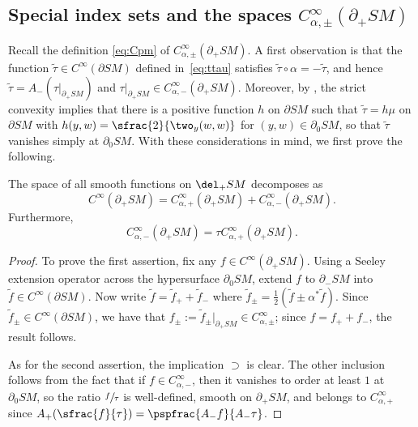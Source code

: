 \subsection{Special index sets and the spaces $C_{\alpha,\pm}^\infty(\partial_+ SM)$} \label{sec:indexSets}

Recall the definition \eqref{eq:Cpm} of $C_{\alpha,\pm}^\infty(\partial_+ SM)$. A first observation is that the function $\tilde \tau \in C^\infty(\partial SM)$ defined in~\eqref{eq:ttau} satisfies $\tilde\tau \circ \alpha = -\tilde\tau$, and hence $\tilde\tau = A_- (\tau|_{\partial_+ SM})$ and $\tau|_{\partial_+ SM}\in C_{\alpha,-}^\infty(\partial_+ SM)$. Moreover, by \cite[Lem.\,6.11]{Monard2020a}, the strict convexity implies that there is a positive function $h$ on $\partial SM$ such that $\tilde \tau = h \mu$ on $\partial SM$ with $h(y,w) = \sfrac{2}{\two_y(w,w)}$ for $(y,w)\in \partial_0 SM$, so that $\tilde\tau$ vanishes simply at $\partial_0 SM$. With these considerations in mind, we first prove the following.

\begin{Lemma} \label{lem:sum}
The space of all smooth functions on $\del_+ SM$ decomposes as
\begin{equation*}
C^\infty (\partial_+ SM) = C_{\alpha,+}^\infty (\partial_+ SM) + C_{\alpha,-}^\infty (\partial_+ SM).
\end{equation*}
Furthermore,
\begin{equation}
C_{\alpha,-}^\infty (\partial_+ SM) = \tau C_{\alpha,+}^\infty (\partial_+ SM).
\label{eq:Cminusprod}
\end{equation}
\end{Lemma}

\begin{proof} To prove the first assertion, fix any $f\in C^\infty (\partial_+ SM)$. Using a Seeley extension operator across the
hypersurface $\partial_0 SM$, extend $f$ to $\partial_- SM$ into $\tilde f\in C^\infty(\partial SM)$. Now write
$\tilde f = \tilde f_+ + \tilde f_-$ where $\tilde f_{\pm} = \frac{1}{2} (\tilde f \pm \alpha^* \tilde f)$. Since
$\tilde f_\pm \in C^\infty(\partial SM)$, we have that $f_\pm := \tilde f_\pm|_{\partial_+ SM} \in C_{\alpha,\pm}^\infty$;
since $f = f_+ + f_-$, the result follows.

As for the second assertion, the implication $\supset$ is clear. The other inclusion follows from the fact that if
$f\in C^\infty_{\alpha,-}$, then it vanishes to order at least $1$ at $\partial_0 SM$, so the ratio $\sfrac{f}{\tau}$
is well-defined, smooth on $\partial_+ SM$, and belongs to $C_{\alpha,+}^\infty$ since $A_+(\sfrac{f}{\tau}) = \pspfrac{A_- f}{A_-\tau}$.
\end{proof}

